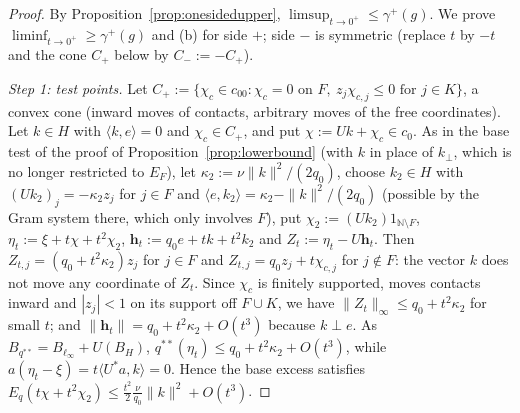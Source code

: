 \documentclass[10pt]{amsart}
\theoremstyle{definition}
\theoremstyle{remark}
\newcommand{\N}{\mathbb N}
\newcommand{\ip}[2]{\langle #1,#2\rangle}
\begin{document}
\begin{proof}
By Proposition~\ref{prop:onesidedupper}, $\limsup_{t\to0^+}\le\gamma^+(g)$.
We prove $\liminf_{t\to0^+}\ge\gamma^+(g)$ and (b) for side $+$; side $-$
is symmetric (replace $t$ by $-t$ and the cone $C_+$ below by
$C_-:=-C_+$).

\emph{Step 1: test points.}  Let
$C_+:=\{\chi_c\in c_{00}:\chi_c=0\text{ on }F,\ z_j\chi_{c,j}\le0\text{ for }
j\in K\}$, a convex cone (inward moves of contacts, arbitrary moves of the
free coordinates).  Let $k\in H$ with $\ip ke=0$ and $\chi_c\in C_+$, and put
$\chi:=Uk+\chi_c\in c_0$.  As in the base test of the proof of
Proposition~\ref{prop:lowerbound} (with $k$ in place of $k_\perp$, which is
no longer restricted to $E_F$), let $\kappa_2:=\nu\|k\|^2/(2q_0)$, choose
$k_2\in H$ with $(Uk_2)_j=-\kappa_2z_j$ for $j\in F$ and
$\ip{e}{k_2}=\kappa_2-\|k\|^2/(2q_0)$ (possible by the Gram system there,
which only involves $F$), put $\chi_2:=(Uk_2)1_{\N\setminus F}$,
$\eta_t:=\xi+t\chi+t^2\chi_2$, $\mathbf h_t:=q_0e+tk+t^2k_2$ and
$Z_t:=\eta_t-U\mathbf h_t$.  Then $Z_{t,j}=(q_0+t^2\kappa_2)z_j$ for $j\in F$
and $Z_{t,j}=q_0z_j+t\chi_{c,j}$ for $j\notin F$: the vector $k$ does not
move any coordinate of $Z_t$.  Since $\chi_c$ is finitely supported, moves
contacts inward and $|z_j|<1$ on its support off $F\cup K$, we have
$\|Z_t\|_\infty\le q_0+t^2\kappa_2$ for small $t$; and $\|\mathbf h_t\|=
q_0+t^2\kappa_2+O(t^3)$ because $k\perp e$.  As
$B_{q^{**}}=B_{\ell_\infty}+U(B_H)$, $q^{**}(\eta_t)\le q_0+t^2\kappa_2+
O(t^3)$, while $a(\eta_t-\xi)=t\ip{U^*a}{k}=0$.  Hence the base excess
satisfies $E_q(t\chi+t^2\chi_2)\le\frac{t^2}2\frac\nu{q_0}\|k\|^2+O(t^3)$.


\end{proof}
\end{document}
